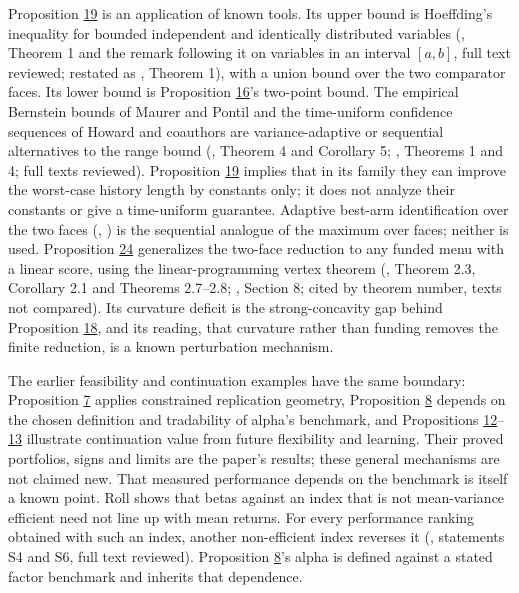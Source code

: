 \documentclass[11pt]{article}
\begin{document}
Proposition \hyperref[res:Proposition-19]{19} is an application of known tools. Its upper bound
is Hoeffding's inequality for bounded independent and identically
distributed variables (\cite{hoeffding1963probability}, Theorem 1 and
the remark following it on variables in an interval \([a,b]\),
full text reviewed; restated as \cite{maurer2009empirical}, Theorem 1),
with a union bound over the two comparator faces. Its lower bound is Proposition \hyperref[res:Proposition-16]{16}'s two-point bound. The
empirical Bernstein bounds of Maurer and Pontil and the
time-uniform confidence sequences of Howard and coauthors are
variance-adaptive or sequential alternatives to the range bound
(\cite{maurer2009empirical}, Theorem 4 and Corollary 5;
\cite{howard2021time}, Theorems 1 and 4; full texts reviewed).
Proposition \hyperref[res:Proposition-19]{19} implies that in its family they can improve the
worst-case history length by constants only; it does not analyze
their constants or give a time-uniform guarantee. Adaptive
best-arm identification over the two faces
(\cite{garivier2016optimal}, \cite{kaufmann2014complexity}) is the
sequential analogue of the maximum over faces; neither is used.
Proposition \hyperref[res:Proposition-24]{24} generalizes the two-face reduction to any funded
menu with a linear score, using the linear-programming vertex
theorem (\cite{bertsimas1997introduction}, Theorem 2.3, Corollary 2.1 and
Theorems 2.7--2.8; \cite{schrijver1986theory}, Section 8; cited by
theorem number, texts not compared). Its curvature deficit is the
strong-concavity gap behind Proposition \hyperref[res:Proposition-18]{18}, and its reading, that
curvature rather than funding removes the finite reduction, is a
known perturbation mechanism.

The earlier feasibility and continuation examples have the
same boundary: Proposition \hyperref[res:Proposition-7]{7} applies constrained replication
geometry, Proposition \hyperref[res:Proposition-8]{8} depends on the chosen definition and
tradability of alpha's benchmark, and Propositions \hyperref[res:Proposition-12]{12}--\hyperref[res:Proposition-13]{13}
illustrate continuation value from future flexibility and
learning. Their proved portfolios, signs and limits are the
paper's results; these general mechanisms are not claimed new.
That measured performance depends on the benchmark is itself a
known point. Roll shows that betas against an index that is not
mean-variance efficient need not line up with mean returns. For
every performance ranking obtained with such an index, another
non-efficient index reverses it (\cite{roll1978ambiguity}, statements
S4 and S6, full text reviewed). Proposition \hyperref[res:Proposition-8]{8}'s alpha is defined
against a stated factor benchmark and inherits that dependence.
\end{document}

